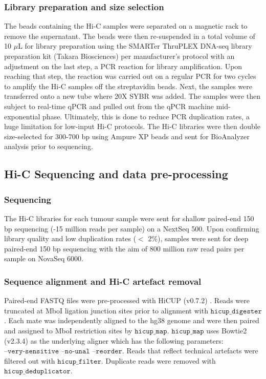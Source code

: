 \subsubsection{Library preparation and size selection}

The beads containing the Hi-C samples were separated on a magnetic rack to remove the supernatant.
The beads were then re-suspended in a total volume of 10 $\mu$L for library preparation using the SMARTer ThruPLEX DNA-seq library preparation kit (Takara Biosciences) per manufacturer's protocol with an adjustment on the last step, a PCR reaction for library amplification.
Upon reaching that step, the reaction was carried out on a regular PCR for two cycles to amplify the Hi-C samples off the streptavidin beads.
Next, the samples were transferred onto a new tube where 20X SYBR was added.
The samples were then subject to real-time qPCR and pulled out from the qPCR machine mid-exponential phase.
Ultimately, this is done to reduce PCR duplication rates, a huge limitation for low-input Hi-C protocols.
The Hi-C libraries were then double size-selected for 300-700 bp using Ampure XP beads and sent for BioAnalyzer analysis prior to sequencing.

\subsection{Hi-C Sequencing and data pre-processing}

\subsubsection{Sequencing}

The Hi-C libraries for each tumour sample were sent for shallow paired-end 150 bp sequencing (-15 million reads per sample) on a NextSeq 500.
Upon confirming library quality and low duplication rates ($<$ 2\%), samples were sent for deep paired-end 150 bp sequencing with the aim of 800 million raw read pairs per sample on NovaSeq 6000.

\subsubsection{Sequence alignment and Hi-C artefact removal}

Paired-end FASTQ files were pre-processed with HiCUP (v0.7.2) \cite{wingettHiCUPPipelineMapping2015}.
Reads were truncated at MboI ligation junction sites prior to alignment with $\texttt{hicup\_digester}$.
Each mate was independently aligned to the hg38 genome and were then paired and assigned to MboI restriction sites by $\texttt{hicup\_map}$.
$\texttt{hicup\_map}$ uses Bowtie2 (v2.3.4) \cite{langmeadFastGappedreadAlignment2012} as the underlying aligner which has the following parameters: $\texttt{--very-sensitive --no-unal --reorder}$.
Reads that reflect technical artefacts were filtered out with $\texttt{hicup\_filter}$.
Duplicate reads were removed with $\texttt{hicup\_deduplicator}$.

